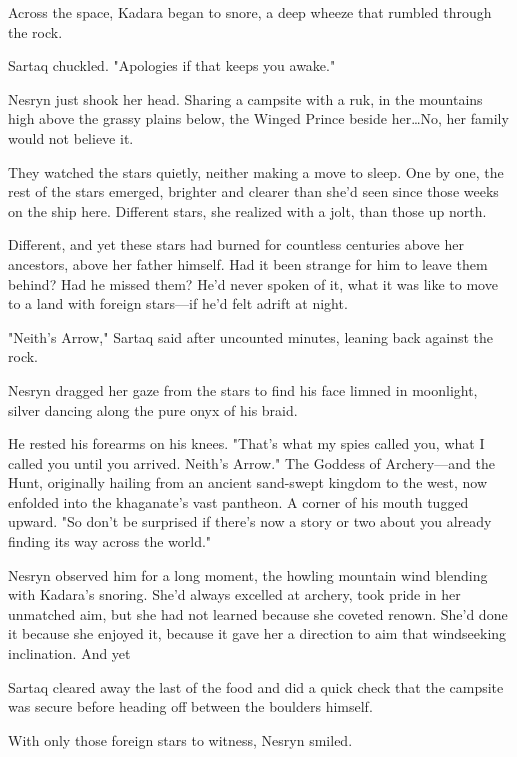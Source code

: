 Across the space, Kadara began to snore, a deep wheeze that rumbled through the rock.

Sartaq chuckled.
"Apologies if that keeps you awake."

Nesryn just shook her head.
Sharing a campsite with a ruk, in the mountains high above the grassy plains below, the Winged Prince beside her\ldots No, her family would not believe it.

They watched the stars quietly, neither making a move to sleep.
One by one, the rest of the stars emerged, brighter and clearer than she'd seen since those weeks on the ship here.
Different stars, she realized with a jolt, than those up north.

Different, and yet these stars had burned for countless centuries above her ancestors, above her father himself.
Had it been strange for him to leave them behind?
Had he missed them?
He'd never spoken of it, what it was like to move to a land with foreign stars---if he'd felt adrift at night.

"Neith's Arrow," Sartaq said after uncounted minutes, leaning back against the rock.

Nesryn dragged her gaze from the stars to find his face limned in moonlight, silver dancing along the pure onyx of his braid.

He rested his forearms on his knees.
"That's what my spies called you, what I called you until you arrived.
Neith's Arrow."
The Goddess of Archery---and the Hunt, originally hailing from an ancient sand-swept kingdom to the west, now enfolded into the khaganate's vast pantheon.
A corner of his mouth tugged upward.
"So don't be surprised if there's now a story or two about you already finding its way across the world."

Nesryn observed him for a long moment, the howling mountain wind blending with Kadara's snoring.
She'd always excelled at archery, took pride in her unmatched aim, but she had not learned because she coveted renown.
She'd done it because she enjoyed it, because it gave her a direction to aim that windseeking inclination.
And yet 

Sartaq cleared away the last of the food and did a quick check that the campsite was secure before heading off between the boulders himself.

With only those foreign stars to witness, Nesryn smiled.

